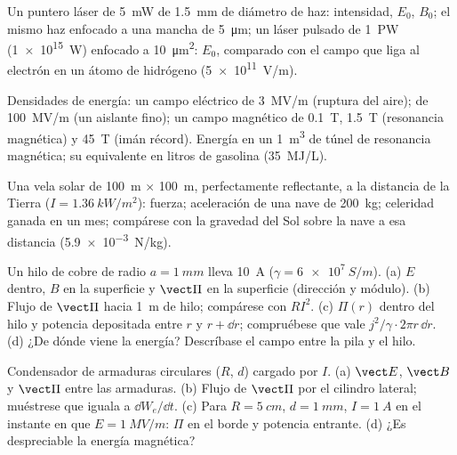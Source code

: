 \begin{exercise}[$\star$]\label{exo:b2:poynting-vector:2}
Un puntero láser de \qty{5}{mW} de \qty{1.5}{mm} de diámetro de haz:
intensidad, $E_0$, $B_0$; el mismo haz enfocado a una mancha de \qty{5}{\micro m}; un láser pulsado de \qty{1}{PW}
(\qty{1e15}{W}) enfocado a \qty{10}{\micro m^2}: $E_0$, comparado
con el campo que liga al electrón en un átomo de hidrógeno (\qty{5e11}{V/m}).
\end{exercise}

\begin{exercise}[$\star$]\label{exo:b2:poynting-vector:3}
Densidades de energía: un campo eléctrico de \qty{3}{MV/m} (ruptura del aire);
de \qty{100}{MV/m} (un aislante fino); un campo magnético de \qty{0.1}{T},
\qty{1.5}{T} (resonancia magnética) y \qty{45}{T} (imán récord). Energía en
un \qty{1}{m^3} de túnel de resonancia magnética; su equivalente en litros
de gasolina (\qty{35}{MJ/L}).
\end{exercise}

\begin{exercise}[$\star$]\label{exo:b2:poynting-vector:4}
Una vela solar de \qty{100}{m} $\times$ \qty{100}{m}, perfectamente
reflectante, a la distancia de la Tierra ($I = \qty{1.36}{kW/m^2}$): fuerza;
aceleración de una nave de \qty{200}{kg}; celeridad ganada en un mes;
compárese con la gravedad del Sol sobre la nave a esa distancia (\qty{5.9e-3}{N/kg}).
\end{exercise}

\begin{exercise}[$\star\star$]\label{exo:b2:poynting-vector:5}
Un hilo de cobre de radio $a = \qty{1}{mm}$ lleva \qty{10}{A} ($\gamma =
\qty{6e7}{S/m}$). (a) $E$ dentro, $B$ en la superficie y $\vect\Pi$ en la
superficie (dirección y módulo). (b) Flujo de $\vect\Pi$ hacia \qty{1}{m}
de hilo; compárese con $RI^2$. (c) $\Pi(r)$ dentro del hilo y potencia
depositada entre $r$ y $r + \dd r$; compruébese que vale $j^2/\gamma\cdot2\pi r\,\dd r$.
(d) ¿De dónde viene la energía? Descríbase el campo entre la pila y el hilo.
\end{exercise}

\begin{exercise}[$\star\star$]\label{exo:b2:poynting-vector:6}
Condensador de armaduras circulares ($R$, $d$) cargado por $I$. (a) $\vect E$, $\vect B$ y
$\vect\Pi$ entre las armaduras. (b) Flujo de $\vect\Pi$ por el cilindro
lateral; muéstrese que iguala a $\dd W_e/\dd t$. (c) Para $R = \qty{5}{cm}$, $d =
\qty{1}{mm}$, $I = \qty{1}{A}$ en el instante en que $E = \qty{1}{MV/m}$: $\Pi$ en el
borde y potencia entrante. (d) ¿Es despreciable la energía magnética?
\end{exercise}

